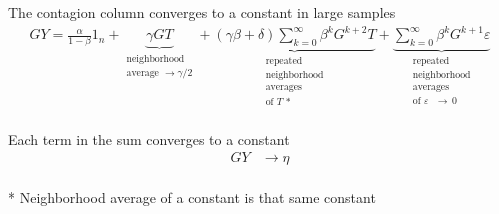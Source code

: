 \documentclass[aspectratio=169]{beamer}
\theoremstyle{remark}
\begin{document}
\begin{frame}{The contagion column converges to a constant in large samples}
    \begin{align*}
        GY = 
        \frac{\alpha}{1 - \beta} 1_n + 
        \underbrace{\gamma G T}_{\substack{\text{neighborhood}                                              \\ \text{average } \to \gamma / 2}} + 
        \underbrace{(\gamma \beta + \delta) \sum_{k=0}^\infty \beta^k G^{k+2} T}_{\substack{\text{repeated} \\ \text{neighborhood} \\ \text{averages} \\ \text{of $T$ *}}} +
        \underbrace{\sum_{k=0}^\infty \beta^k G^{k+1} \varepsilon}_{\substack{\text{repeated}               \\ \text{neighborhood} \\ \text{averages} \\ \text{of $\varepsilon$ } \to \, 0}}
    \end{align*} \\
    \vspace{4mm}
    Each term in the sum converges to a constant
    \begin{align*}
        GY & \to \eta
    \end{align*} \\
    \vspace{4mm}
    \footnotesize
    * Neighborhood average of a constant is that same constant
\end{frame}
\end{document}
